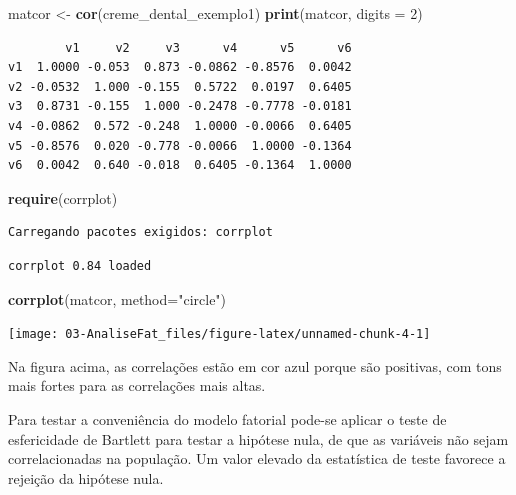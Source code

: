 \documentclass[12pt,brazil,oneside]{book}
\newenvironment{Shaded}{\begin{snugshade}}{\end{snugshade}}
\newcommand{\DataTypeTok}[1]{\textcolor[rgb]{0.13,0.29,0.53}{#1}}
\newcommand{\DecValTok}[1]{\textcolor[rgb]{0.00,0.00,0.81}{#1}}
\newcommand{\KeywordTok}[1]{\textcolor[rgb]{0.13,0.29,0.53}{\textbf{#1}}}
\newcommand{\NormalTok}[1]{#1}
\newcommand{\StringTok}[1]{\textcolor[rgb]{0.31,0.60,0.02}{#1}}
\begin{document}
\begin{Shaded}
\begin{Highlighting}[]
\NormalTok{matcor <-}\StringTok{ }\KeywordTok{cor}\NormalTok{(creme_dental_exemplo1)}
\KeywordTok{print}\NormalTok{(matcor, }\DataTypeTok{digits =} \DecValTok{2}\NormalTok{)}
\end{Highlighting}
\end{Shaded}

\begin{verbatim}
        v1     v2     v3      v4      v5      v6
v1  1.0000 -0.053  0.873 -0.0862 -0.8576  0.0042
v2 -0.0532  1.000 -0.155  0.5722  0.0197  0.6405
v3  0.8731 -0.155  1.000 -0.2478 -0.7778 -0.0181
v4 -0.0862  0.572 -0.248  1.0000 -0.0066  0.6405
v5 -0.8576  0.020 -0.778 -0.0066  1.0000 -0.1364
v6  0.0042  0.640 -0.018  0.6405 -0.1364  1.0000
\end{verbatim}

\begin{Shaded}
\begin{Highlighting}[]
\KeywordTok{require}\NormalTok{(corrplot)}
\end{Highlighting}
\end{Shaded}

\begin{verbatim}
Carregando pacotes exigidos: corrplot
\end{verbatim}

\begin{verbatim}
corrplot 0.84 loaded
\end{verbatim}

\begin{Shaded}
\begin{Highlighting}[]
\KeywordTok{corrplot}\NormalTok{(matcor, }\DataTypeTok{method=}\StringTok{"circle"}\NormalTok{)}
\end{Highlighting}
\end{Shaded}

\begin{center}\texttt{[image: 03-AnaliseFat\_files/figure-latex/unnamed-chunk-4-1]} \end{center}

Na figura acima, as correlações estão em cor azul porque são positivas,
com tons mais fortes para as correlações mais altas.

Para testar a conveniência do modelo fatorial pode-se aplicar o teste de
esfericidade de Bartlett para testar a hipótese nula, de que as
variáveis não sejam correlacionadas na população. Um valor elevado da
estatística de teste favorece a rejeição da hipótese nula.
\end{document}
